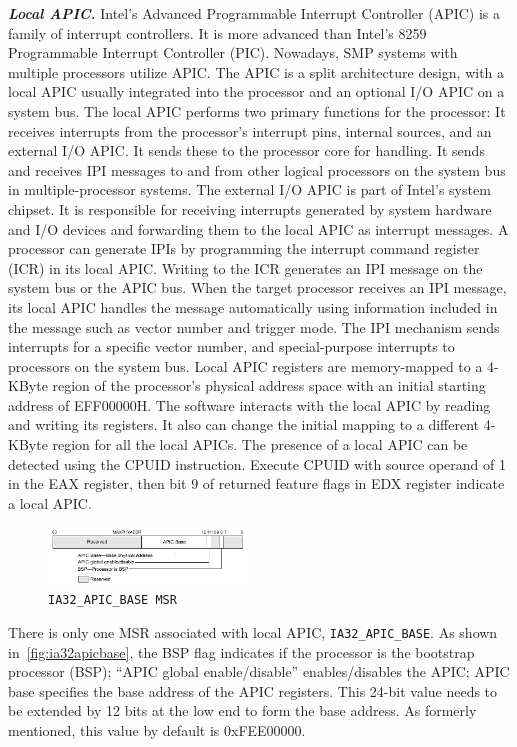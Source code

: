 \textbf{\textit{Local APIC.}} Intel's Advanced Programmable Interrupt Controller (APIC) is a family of interrupt controllers. It is more advanced than Intel's 8259 Programmable Interrupt Controller (PIC). Nowadays, SMP systems with multiple processors utilize APIC. The APIC is a split architecture design, with a local APIC usually integrated into the processor and an optional I/O APIC on a system bus. The local APIC performs two primary functions for the processor:
It receives interrupts from the processor's interrupt pins, internal sources, and an external I/O APIC. It sends these to the processor core for handling.
It sends and receives IPI messages to and from other logical processors on the system bus in multiple-processor systems.
The external I/O APIC is part of Intel's system chipset. It is responsible for receiving interrupts generated by system hardware and I/O devices and forwarding them to the local APIC as interrupt messages. A processor can generate IPIs by programming the interrupt command register (ICR) in its local APIC. Writing to the ICR generates an IPI message on the system bus or the APIC bus. When the target processor receives an IPI message, its local APIC handles the message automatically using information included in the message such as vector number and trigger mode. The IPI mechanism sends interrupts for a specific vector number, and special-purpose interrupts to processors on the system bus. Local APIC registers are memory-mapped to a 4-KByte region of the processor's physical address space with an initial starting address of EFF00000H. The software interacts with the local APIC by reading and writing its registers. It also can change the initial mapping to a different 4-KByte region for all the local APICs. The presence of a local APIC can be detected using the CPUID instruction. Execute CPUID with source operand of 1 in the EAX register, then bit 9 of returned feature flags in EDX register indicate a local APIC.


\begin{figure}[th]
  \includegraphics[width=0.47\textwidth]{figures/ia32apicbase}
  \centering
  \caption{\texttt{IA32\_APIC\_BASE MSR}}
  \label{fig:ia32apicbase}
\end{figure}

There is only one MSR associated with local APIC, \texttt{IA32\_APIC\_BASE}. As shown in~\autoref{fig:ia32apicbase}, the BSP flag indicates if the processor is the bootstrap processor (BSP); ``APIC global enable/disable'' enables/disables the APIC; APIC base specifies the base address of the APIC registers. This 24-bit value needs to be extended by 12 bits at the low end to form the base address. As formerly mentioned, this value by default is 0xFEE00000.


